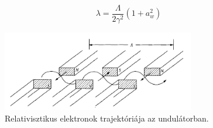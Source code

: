 \documentclass[12pt, a4paper]{article}
\begin{document}
\begin{equation}
\lambda = \frac{\Lambda}{2\gamma^2} \left( 1 + a_w^2 \right)
\end{equation}

\begin{figure}[H]
\center
\includegraphics[width=0.75\textwidth]{Undulator}
\caption{Relativisztikus elektronok trajektóriája az undulátorban.}
\end{figure}
\end{document}

